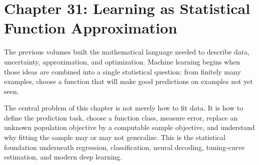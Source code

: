 \section{Chapter 31: Learning as Statistical Function Approximation}
\label{ch:learning-statistical-function-approximation}

The previous volumes built the mathematical language needed to describe data, uncertainty, approximation, and optimization. Machine learning begins when those ideas are combined into a single statistical question: from finitely many examples, choose a function that will make good predictions on examples not yet seen.

The central problem of this chapter is not merely how to fit data. It is how to define the prediction task, choose a function class, measure error, replace an unknown population objective by a computable sample objective, and understand why fitting the sample may or may not generalize. This is the statistical foundation underneath regression, classification, neural decoding, tuning-curve estimation, and modern deep learning.

